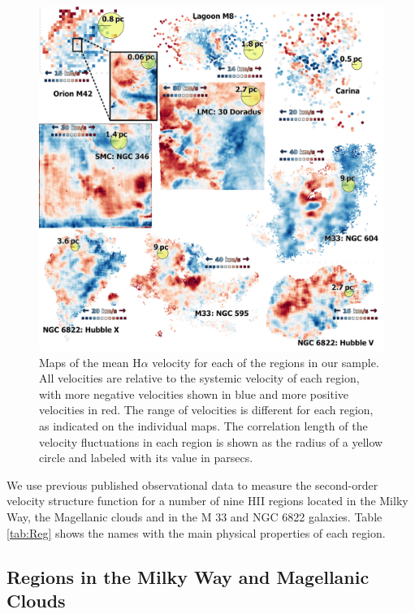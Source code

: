 \documentclass[fleqn,usenatbib, useAMS, a4paper]{mnras}
\newcommand\ha{\ensuremath{\text{H}\alpha}}
\begin{document}
\begin{figure}
  \centering
  \includegraphics[width=\linewidth]{Figures/velocity-maps-mosaic}
  \caption{
    Maps of the mean \ha{} velocity for each of the regions in our sample.
    All velocities are relative to the systemic velocity of each region,
    with more negative velocities shown in blue and more positive velocities in red.
    The range of velocities is different for each region, as indicated on the individual maps.
    The correlation length of the velocity fluctuations in each region
    is shown as the radius of a yellow circle and labeled with its value in parsecs. 
  }
  \label{fig:velocity-maps}
\end{figure}

We use previous published observational data to measure the second-order velocity structure function for a number of nine HII regions located in the Milky Way, the Magellanic clouds and in the M 33 and NGC 6822 galaxies. 
Table \ref{tab:Reg} shows the names with the main physical properties of each region. 

\subsection{Regions in the Milky Way and Magellanic Clouds}
\label{sec:regions-milky-way}
\end{document}
